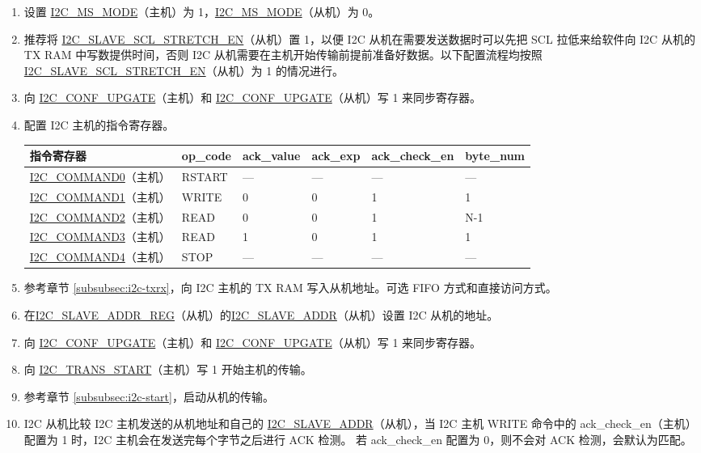 \documentclass[main\_\_CN.tex]{subfiles}
\begin{document}
\begin{enumerate}
\item 设置 \hyperref[fielddesc:I2CMSMODE]{I2C\_MS\_MODE}（主机）为 1，\hyperref[fielddesc:I2CMSMODE]{I2C\_MS\_MODE}（从机）为 0。
\item 推荐将 \hyperref[fielddesc:I2CSLAVESCLSTRETCHEN]{I2C\_SLAVE\_SCL\_STRETCH\_EN}（从机）置 1，以便 I2C 从机在需要发送数据时可以先把 SCL 拉低来给软件向 I2C 从机的 TX RAM 中写数提供时间，否则 I2C 从机需要在主机开始传输前提前准备好数据。以下配置流程均按照\hyperref[fielddesc:I2CSLAVESCLSTRETCHEN]{I2C\_SLAVE\_SCL\_STRETCH\_EN}（从机）为 1 的情况进行。
\item 向 \hyperref[fielddesc:I2CCONFUPGATE]{I2C\_CONF\_UPGATE}（主机）和 \hyperref[fielddesc:I2CCONFUPGATE]{I2C\_CONF\_UPGATE}（从机）写 1 来同步寄存器。
\item 配置 I2C 主机的指令寄存器。

\begin{longtable}{ | p{4cm} | p{2cm} | p{2cm} | p{2cm} |p{2cm} | p{2cm} |}
\hline\rowcolor{lightgray}
指令寄存器& op\_code & ack\_value&ack\_exp&ack\_check\_en&byte\_num  \\ \hline
\hyperref[fielddesc:I2CCOMMAND0]{I2C\_COMMAND0}（主机）& RSTART& ---&---&---&---  \\ \hline
\hyperref[fielddesc:I2CCOMMAND1]{I2C\_COMMAND1}（主机）& WRITE& 0&0&1&1  \\ \hline
\hyperref[fielddesc:I2CCOMMAND2]{I2C\_COMMAND2}（主机）& READ& 0&0&1&N-1  \\ \hline
\hyperref[fielddesc:I2CCOMMAND3]{I2C\_COMMAND3}（主机）& READ& 1&0&1&1  \\ \hline
\hyperref[fielddesc:I2CCOMMAND4]{I2C\_COMMAND4}（主机）& STOP& ---&---&---&---  \\ \hline
\end{longtable}

\item 参考章节 \ref{subsubsec:i2c-txrx}，向 I2C 主机的 TX RAM 写入从机地址。可选 FIFO 方式和直接访问方式。
\item 在\hyperref[regdesc:I2CSLAVEADDRREG]{I2C\_SLAVE\_ADDR\_REG}（从机）的\hyperref[fielddesc:I2CSLAVEADDR]{I2C\_SLAVE\_ADDR}（从机）设置 I2C 从机的地址。
\item 向 \hyperref[fielddesc:I2CCONFUPGATE]{I2C\_CONF\_UPGATE}（主机）和 \hyperref[fielddesc:I2CCONFUPGATE]{I2C\_CONF\_UPGATE}（从机）写 1 来同步寄存器。
\item 向 \hyperref[fielddesc:I2CTRANSSTART]{I2C\_TRANS\_START}（主机）写 1 开始主机的传输。
\item 参考章节 \ref{subsubsec:i2c-start}，启动从机的传输。
\item I2C 从机比较 I2C 主机发送的从机地址和自己的 \hyperref[fielddesc:I2CSLAVEADDR]{I2C\_SLAVE\_ADDR}（从机），当 I2C 主机 WRITE 命令中的 ack\_check\_en（主机）配置为 1 时，I2C 主机会在发送完每个字节之后进行 ACK 检测。 若 ack\_check\_en 配置为 0，则不会对 ACK 检测，会默认为匹配。


\end{enumerate}
\end{document}
